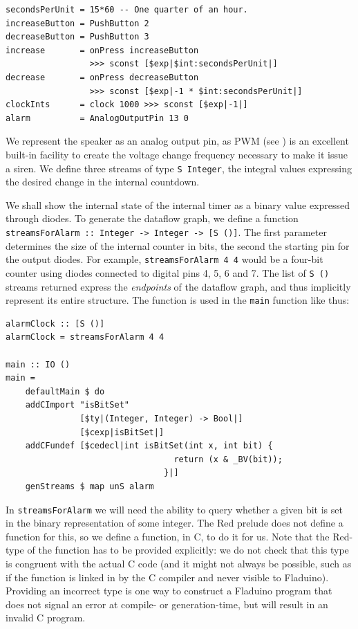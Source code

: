 \documentclass[a4paper, oneside, final]{memoir}
\let\Fref\undefined
\begin{document}
\begin{verbatim}
secondsPerUnit = 15*60 -- One quarter of an hour.
increaseButton = PushButton 2
decreaseButton = PushButton 3
increase       = onPress increaseButton 
                 >>> sconst [$exp|$int:secondsPerUnit|]
decrease       = onPress decreaseButton 
                 >>> sconst [$exp|-1 * $int:secondsPerUnit|]
clockInts      = clock 1000 >>> sconst [$exp|-1|]
alarm          = AnalogOutputPin 13 0
\end{verbatim}

We represent the speaker as an analog output pin, as PWM (see
\Fref{sec:pwm}) is an excellent built-in facility to create the
voltage change frequency necessary to make it issue a siren.  We
define three streams of type \texttt{S Integer}, the integral values
expressing the desired change in the internal countdown.

We shall show the internal state of the internal timer as a binary
value expressed through diodes.  To generate the dataflow graph, we
define a function \texttt{streamsForAlarm :: Integer -> Integer -> [S
  ()]}.  The first parameter determines the size of the internal
counter in bits, the second the starting pin for the output diodes.
For example, \texttt{streamsForAlarm 4 4} would be a four-bit counter
using diodes connected to digital pins 4, 5, 6 and 7.  The list of
\texttt{S ()} streams returned express the \textit{endpoints} of the
dataflow graph, and thus implicitly represent its entire structure.
The function is used in the \texttt{main} function like thus:

\begin{verbatim}
alarmClock :: [S ()]
alarmClock = streamsForAlarm 4 4

main :: IO ()
main =
    defaultMain $ do
    addCImport "isBitSet" 
               [$ty|(Integer, Integer) -> Bool|] 
               [$cexp|isBitSet|]
    addCFundef [$cedecl|int isBitSet(int x, int bit) {
                                  return (x & _BV(bit));
                                }|]
    genStreams $ map unS alarm
\end{verbatim}

In \texttt{streamsForAlarm} we will need the ability to query whether
a given bit is set in the binary representation of some integer.  The
Red prelude does not define a function for this, so we define a
function, in C, to do it for us.  Note that the Red-type of the
function has to be provided explicitly: we do not check that this type
is congruent with the actual C code (and it might not always be
possible, such as if the function is linked in by the C compiler and
never visible to Fladuino).  Providing an incorrect type is one way to
construct a Fladuino program that does not signal an error at compile-
or generation-time, but will result in an invalid C program.
\end{document}
